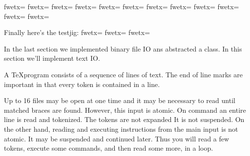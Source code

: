 \fwbeginmacro
{}\fwequals \fwodef {}fwetx=%
\fwbtx[
]fwetx=%
\fwbtx[
]fwetx=%
\fwbtx[
]fwetx=%
\fwbtx[
]fwetx=%
\fwbtx[
]fwetx=%
\fwbtx[
]fwetx=%
\fwbtx[
]fwetx=%
\fwbtx[
]fwetx=%
\fwbtx[
]fwetx=%
\fwbtx[
]fwetx=%
\fwbtx[
]fwetx=%
\fwcdef 
\fwbeginmacronotes
{}
\fwendmacronotes
\fwendmacro




Finally here's the testjig:
\fwbeginmacro
{}\fwequals \fwodef {}fwetx=%
\fwbtx[

]fwetx=%
\fwoparen \fwoquote{}\fwcquote\fwcomma \fwoquote{}\fwcquote\fwcparen \fwbtx[
]fwetx=%
\fwcdef 
\fwbeginmacronotes
{}
\fwendmacronotes
\fwendmacro
















In the last section we implemented binary file IO ans abstracted a
 class. In this section we'll implement text IO.

A \TeX program consists of a sequence of lines of text. The end of
line marks are important in that every token is contained in a line.

Up to 16 files may be open at one time and it may be necessary to read
until matched braces are found. However, this input is atomic.  On
command an entire line is read and tokenized. The tokens are not
expanded It is not suspended. On the other hand, reading and executing
instructions from the main input is not atomic. It may be suspended
and continued later. Thus you will read a few tokens, execute some
commands, and then read some more, in a loop.

